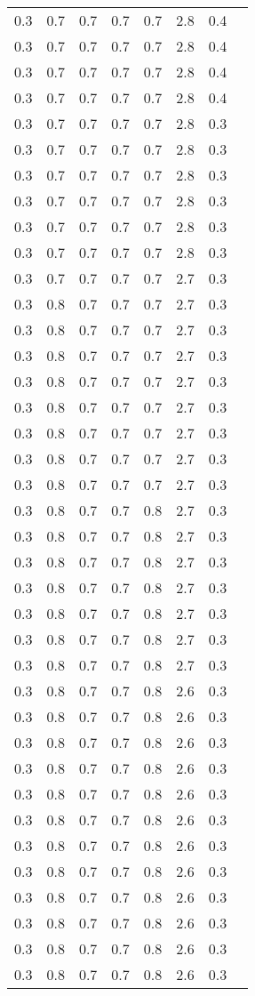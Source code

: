 \begin{tabular}{L{1in}|L{1in}|L{1in}|L{1in}|L{1in}|L{1in}|L{1in}|L{1in}}
0.3&0.7&0.7&0.7&0.7&2.8&0.4\\
0.3&0.7&0.7&0.7&0.7&2.8&0.4\\
0.3&0.7&0.7&0.7&0.7&2.8&0.4\\
0.3&0.7&0.7&0.7&0.7&2.8&0.4\\
0.3&0.7&0.7&0.7&0.7&2.8&0.3\\
0.3&0.7&0.7&0.7&0.7&2.8&0.3\\
0.3&0.7&0.7&0.7&0.7&2.8&0.3\\
0.3&0.7&0.7&0.7&0.7&2.8&0.3\\
0.3&0.7&0.7&0.7&0.7&2.8&0.3\\
0.3&0.7&0.7&0.7&0.7&2.8&0.3\\
0.3&0.7&0.7&0.7&0.7&2.7&0.3\\
0.3&0.8&0.7&0.7&0.7&2.7&0.3\\
0.3&0.8&0.7&0.7&0.7&2.7&0.3\\
0.3&0.8&0.7&0.7&0.7&2.7&0.3\\
0.3&0.8&0.7&0.7&0.7&2.7&0.3\\
0.3&0.8&0.7&0.7&0.7&2.7&0.3\\
0.3&0.8&0.7&0.7&0.7&2.7&0.3\\
0.3&0.8&0.7&0.7&0.7&2.7&0.3\\
0.3&0.8&0.7&0.7&0.7&2.7&0.3\\
0.3&0.8&0.7&0.7&0.8&2.7&0.3\\
0.3&0.8&0.7&0.7&0.8&2.7&0.3\\
0.3&0.8&0.7&0.7&0.8&2.7&0.3\\
0.3&0.8&0.7&0.7&0.8&2.7&0.3\\
0.3&0.8&0.7&0.7&0.8&2.7&0.3\\
0.3&0.8&0.7&0.7&0.8&2.7&0.3\\
0.3&0.8&0.7&0.7&0.8&2.7&0.3\\
0.3&0.8&0.7&0.7&0.8&2.6&0.3\\
0.3&0.8&0.7&0.7&0.8&2.6&0.3\\
0.3&0.8&0.7&0.7&0.8&2.6&0.3\\
0.3&0.8&0.7&0.7&0.8&2.6&0.3\\
0.3&0.8&0.7&0.7&0.8&2.6&0.3\\
0.3&0.8&0.7&0.7&0.8&2.6&0.3\\
0.3&0.8&0.7&0.7&0.8&2.6&0.3\\
0.3&0.8&0.7&0.7&0.8&2.6&0.3\\
0.3&0.8&0.7&0.7&0.8&2.6&0.3\\
0.3&0.8&0.7&0.7&0.8&2.6&0.3\\
0.3&0.8&0.7&0.7&0.8&2.6&0.3\\
0.3&0.8&0.7&0.7&0.8&2.6&0.3\\

\end{tabular}

